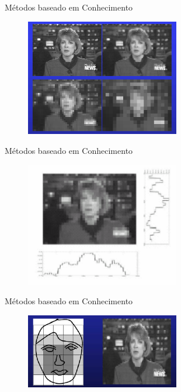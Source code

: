 \documentclass[aspectratio=169, xcolor=dvipsnames]{beamer}
\begin{document}
\begin{frame}{Métodos baseado em Conhecimento}
	\begin{figure}
		\centering
		\label{fig:inst}
		\includegraphics[width=0.6\textwidth]{img/m1-1.png}
	\end{figure}
\end{frame}

\begin{frame}{Métodos baseado em Conhecimento}
	\begin{figure}
		\centering
		\includegraphics[width=0.6\textwidth]{img/m1-3.png}
	\end{figure}
\end{frame}

\begin{frame}{Métodos baseado em Conhecimento}
	\begin{figure}
		\centering
		\label{fig:inst}
		\includegraphics[width=0.6\textwidth]{img/m1-2.png}
	\end{figure}
\end{frame}
\end{document}
